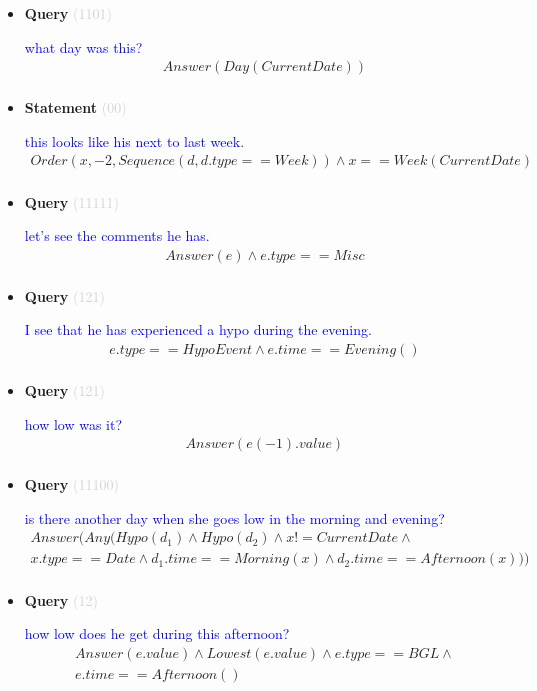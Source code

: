 \documentclass[11pt]{article}
\newcommand{\key}[1]{\textcolor{lightgray}{#1}}
\newcounter{CQuery}
\newcounter{CStatement}
\begin{document}
\begin{itemize}
\item
\textbf{Query\theCQuery} \key{(1101)} \addtocounter{CQuery}{1}
\textcolor{blue}{ what day was this? }
\begin{multline*}
Answer(Day(CurrentDate)) \\ 
\end{multline*}


\item
\textbf{Statement\theCStatement} \key{(00)} \addtocounter{CStatement}{1}
\textcolor{blue}{ this looks like his next to last week. }
\begin{multline*}
Order(x, -2, Sequence(d, d.type==Week)) \wedge x==Week(CurrentDate) \\ 
\end{multline*}


\item
\textbf{Query\theCQuery} \key{(11111)} \addtocounter{CQuery}{1}
\textcolor{blue}{ let's see the comments he has. }
\begin{multline*}
Answer(e) \wedge e.type==Misc \\ 
\end{multline*}


\item
\textbf{Query\theCQuery} \key{(121)} \addtocounter{CQuery}{1}
\textcolor{blue}{ I see that he has experienced a hypo during the evening. }
\begin{multline*}
e.type==HypoEvent \wedge e.time==Evening() \\ 
\end{multline*}


\item
\textbf{Query\theCQuery} \key{(121)} \addtocounter{CQuery}{1}
\textcolor{blue}{ how low was it? }
\begin{multline*}
Answer(e(-1).value) \\ 
\end{multline*}


\item
\textbf{Query\theCQuery} \key{(11100)} \addtocounter{CQuery}{1}
\textcolor{blue}{ is there another day when she goes low in the morning and evening? }
\begin{multline*}
Answer(Any(Hypo(d_1) \wedge Hypo(d_2) \wedge x != CurrentDate \wedge \\ 
x.type==Date \wedge d_1.time==Morning(x) \wedge d_2.time==Afternoon(x))) \\ 
\end{multline*}


\item
\textbf{Query\theCQuery} \key{(12)} \addtocounter{CQuery}{1}
\textcolor{blue}{ how low does he get during this afternoon? }
\begin{multline*}
Answer(e.value) \wedge Lowest(e.value) \wedge e.type==BGL \wedge \\ 
e.time==Afternoon() \\ 
\end{multline*}



\end{itemize}
\end{document}
